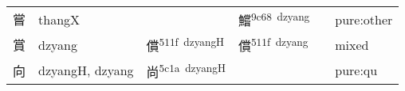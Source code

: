 \documentclass[14pt,a4paper]{scrartcl}
\begin{document}
\begin{longtable}[c]{@{}llllll@{}}
\begin{minipage}[t]{0.14\columnwidth}\raggedright\strut
嘗
\strut\end{minipage} &
\begin{minipage}[t]{0.14\columnwidth}\raggedright\strut
thangX
\strut\end{minipage} &
\begin{minipage}[t]{0.14\columnwidth}\raggedright\strut
\strut\end{minipage} &
\begin{minipage}[t]{0.14\columnwidth}\raggedright\strut
鱨\textsuperscript{9c68~dzyang}
\strut\end{minipage} &
\begin{minipage}[t]{0.14\columnwidth}\raggedright\strut
\strut\end{minipage} &
\begin{minipage}[t]{0.14\columnwidth}\raggedright\strut
pure:other
\strut\end{minipage}\tabularnewline
\begin{minipage}[t]{0.14\columnwidth}\raggedright\strut
賞
\strut\end{minipage} &
\begin{minipage}[t]{0.14\columnwidth}\raggedright\strut
dzyang
\strut\end{minipage} &
\begin{minipage}[t]{0.14\columnwidth}\raggedright\strut
償\textsuperscript{511f~dzyangH}
\strut\end{minipage} &
\begin{minipage}[t]{0.14\columnwidth}\raggedright\strut
償\textsuperscript{511f~dzyang}
\strut\end{minipage} &
\begin{minipage}[t]{0.14\columnwidth}\raggedright\strut
\strut\end{minipage} &
\begin{minipage}[t]{0.14\columnwidth}\raggedright\strut
mixed
\strut\end{minipage}\tabularnewline
\begin{minipage}[t]{0.14\columnwidth}\raggedright\strut
向
\strut\end{minipage} &
\begin{minipage}[t]{0.14\columnwidth}\raggedright\strut
dzyangH, dzyang
\strut\end{minipage} &
\begin{minipage}[t]{0.14\columnwidth}\raggedright\strut
尚\textsuperscript{5c1a~dzyangH}
\strut\end{minipage} &
\begin{minipage}[t]{0.14\columnwidth}\raggedright\strut
\strut\end{minipage} &
\begin{minipage}[t]{0.14\columnwidth}\raggedright\strut
\strut\end{minipage} &
\begin{minipage}[t]{0.14\columnwidth}\raggedright\strut
pure:qu
\strut\end{minipage}\tabularnewline
\bottomrule
\end{longtable}
\end{document}
